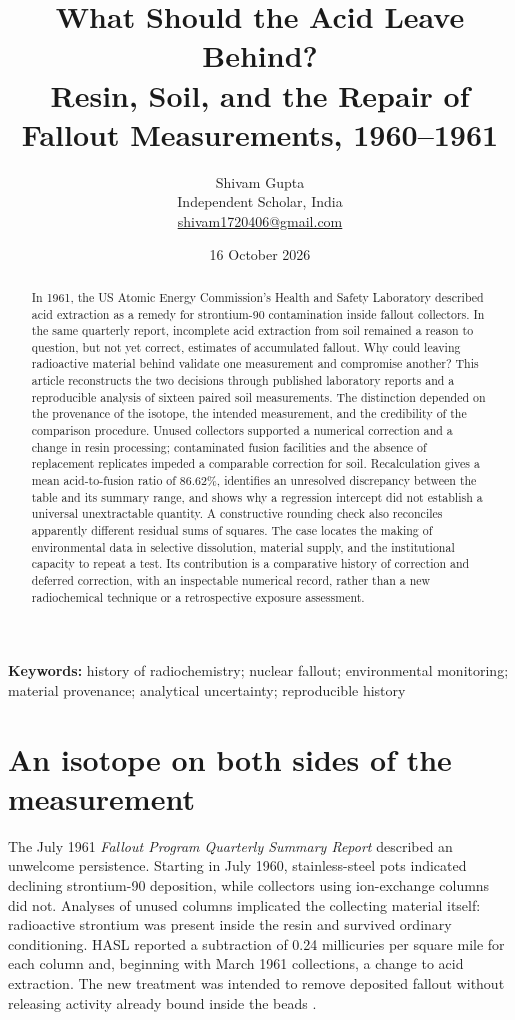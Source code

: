 \documentclass[11pt,a4paper]{article}
\title{\LARGE What Should the Acid Leave Behind?\\[5pt]\Large Resin, Soil, and the Repair of Fallout Measurements, 1960--1961}
\author{Shivam Gupta\\\normalsize Independent Scholar, India\\\normalsize\href{mailto:shivam1720406@gmail.com}{shivam1720406@gmail.com}}
\date{16 October 2026}
\begin{document}
\maketitle
\begin{abstract}
In 1961, the US Atomic Energy Commission's Health and Safety Laboratory described acid extraction as a remedy for strontium-90 contamination inside fallout collectors. In the same quarterly report, incomplete acid extraction from soil remained a reason to question, but not yet correct, estimates of accumulated fallout. Why could leaving radioactive material behind validate one measurement and compromise another? This article reconstructs the two decisions through published laboratory reports and a reproducible analysis of sixteen paired soil measurements. The distinction depended on the provenance of the isotope, the intended measurement, and the credibility of the comparison procedure. Unused collectors supported a numerical correction and a change in resin processing; contaminated fusion facilities and the absence of replacement replicates impeded a comparable correction for soil. Recalculation gives a mean acid-to-fusion ratio of 86.62\%, identifies an unresolved discrepancy between the table and its summary range, and shows why a regression intercept did not establish a universal unextractable quantity. A constructive rounding check also reconciles apparently different residual sums of squares. The case locates the making of environmental data in selective dissolution, material supply, and the institutional capacity to repeat a test. Its contribution is a comparative history of correction and deferred correction, with an inspectable numerical record, rather than a new radiochemical technique or a retrospective exposure assessment.
\end{abstract}
\noindent\textbf{Keywords:} history of radiochemistry; nuclear fallout; environmental monitoring; material provenance; analytical uncertainty; reproducible history

\section{An isotope on both sides of the measurement}
The July 1961 \textit{Fallout Program Quarterly Summary Report} described an unwelcome persistence. Starting in July 1960, stainless-steel pots indicated declining strontium-90 deposition, while collectors using ion-exchange columns did not. Analyses of unused columns implicated the collecting material itself: radioactive strontium was present inside the resin and survived ordinary conditioning. HASL reported a subtraction of 0.24 millicuries per square mile for each column and, beginning with March 1961 collections, a change to acid extraction. The new treatment was intended to remove deposited fallout without releasing activity already bound inside the beads \citep[pp.~2--3]{hasl113}.
\end{document}
